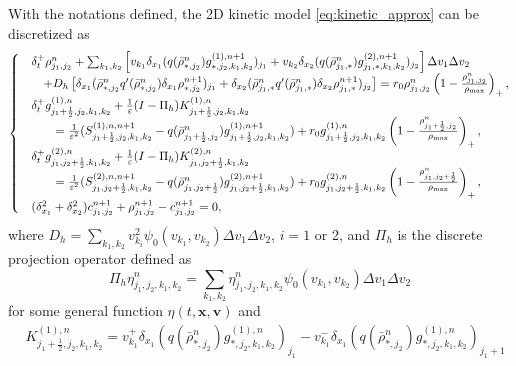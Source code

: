 \documentclass{aims} %
\theoremstyle{definition}
\begin{document}
{With the notations defined, the 2D kinetic model \eqref{eq:kinetic_approx} can be discretized as 
\begin{align}
\label{eq:scheme_2D}
    \begin{cases}
    & \delta_t^+ \rho_{j_1,j_2}^n +  
    \sum_{k_1,k_2} \left[v_{k_1}\delta_{x_1}(q( {\bar{\rho}}_{*,j_2}^n) g_{*,j_2,k_1,k_2}^{(1), n+1})_{j_1} +  v_{k_2}\delta_{x_2}(q( {\bar{\rho}}_{j_1,*}^n) g_{j_1,*,k_1,k_2}^{(2), n+1})_{j_2}\right]\Delta v_1 \Delta v_2\\
     & \quad + D_h \left[ \delta_{x_1}( {\bar{\rho}}_{*,j_2}^n q'( {\bar{\rho}}_{*,j_2}^n)\delta_{x_1} \rho_{*,j_2}^{n+1})_{j_1} + \delta_{x_2}( {\bar{\rho}}_{j_1,*}^n q'( {\bar{\rho}}_{j_1,*}^n)\delta_{x_2} \rho_{j_1,*}^{n+1})_{j_2} \right]
    = r_0 \rho_{j_1,j_2}^{n}\left(1 - \frac{\rho_{j_1,j_2}^n}{\rho_{\rm max}}\right)_+,\\
    &\delta_t^+ g_{j_1+\frac12,j_2,k_1, k_2}^{(1),n} + \frac{1}{\varepsilon}(I-\Pi_h) K_{j_1+\frac12,j_2,k_1, k_2}^{(1),n} \\
    &\qquad = \frac{1}{\varepsilon^2}(S_{j_1+\frac12,j_2,k_1,k_2}^{(1), n, n+1} - q( {\bar{\rho}}_{j_1+\frac12,j_2}^n) g_{j_1+\frac12,j_2,k_1,k_2}^{(1), n+1}) + r_0 g_{j_1+\frac12,j_2,k_1,k_2}^{(1),n}\left(1 - \frac{\rho_{j_1+\frac12,j_2}^n}{\rho_{\rm max}}\right)_+,\\
        &\delta_t^+ g_{j_1,j_2+\frac12,k_1, k_2}^{(2),n} + \frac{1}{\varepsilon}(I-\Pi_h) K_{j_1,j_2+\frac12,k_1, k_2}^{(2),n} \\
    & \qquad = \frac{1}{\varepsilon^2}(S_{j_1,j_2+\frac12,k_1,k_2}^{(2), n, n+1} - q( {\bar{\rho}}_{j_1,j_2+\frac12}^n) g_{j_1,j_2+\frac12,k_1,k_2}^{(2), n+1}) + r_0 g_{j_1,j_2+\frac12,k_1,k_2}^{(2),n}\left(1 - \frac{\rho_{j_1,j_2+\frac12}^n}{\rho_{\rm max}}\right)_+,\\
    & (\delta_{x_1}^2 + \delta_{x_2}^2) c_{j_1,j_2}^{n+1} + \rho_{j_1,j_2}^{n+1} - c_{j_1,j_2}^{n+1} = 0,
\end{cases}
\end{align}
where 
{ 
$D_h=\sum_{k_1,k_2} v_{k_i}^2 \psi_{0}(v_{k_1},v_{k_2})\Delta v_1 \Delta v_2$, $i=1$ or 2, and  
}
$\Pi_h$ is the discrete projection operator defined as 
\begin{equation*}
    \Pi_h \eta_{j_1,j_2,k_1,k_2}^n = \sum_{k_1,k_2}\eta_{j_1,j_2,k_1,k_2}^n \psi_{0}(v_{k_1},v_{k_2})\Delta v_1 \Delta v_2
\end{equation*} 
for some general function $\eta(t,\mathbf{x},\mathbf{v})$ and 
\begin{align*}
    & K_{j_1+\frac12,j_2,k_1, k_2}^{(1),n}  = v_{k_1}^+\delta_{x_1}(q( {\bar{\rho}}_{*,j_2}^n) g_{*,j_2,k_1,k_2}^{(1),n})_{j_1} - v_{k_1}^-\delta_{x_1}(q( {\bar{\rho}}_{*,j_2}^n) g_{*,j_2,k_1,k_2}^{(1),n})_{j_1+1}\\

\end{align*}}
\end{document}
